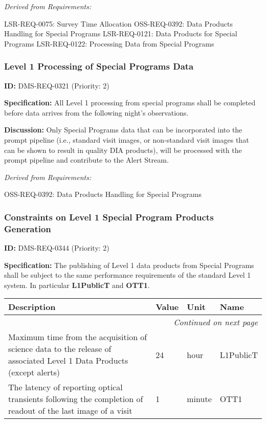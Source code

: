 \documentclass[SE,toc,lsstdraft]{lsstdoc}
\makeatletter
\newcommand{\paramname}[1]{\hspace{0pt}#1}
\newcommand{\unitname}[1]{\hspace{0pt}#1}
\newenvironment{parameters}[0]{%
\setlength\LTleft{0pt}
\setlength\LTright{\fill}
\begin{small}
\begin{longtable}[]{|p{0.49\textwidth}|l|p{0.6in}|p{1.70in}@{}|}

\hline \textbf{Description} & \textbf{Value} & \textbf{Unit} & \textbf{Name} \\ \hline
\endhead

\hline \multicolumn{4}{r}{\emph{Continued on next page}} \\
\endfoot

\hline\hline
\endlastfoot
}{%
\hline
\end{longtable}
\end{small}
}
\makeatother
\begin{document}
\emph{Derived from Requirements:}

LSR-REQ-0075:
Survey Time Allocation \newline
OSS-REQ-0392:
Data Products Handling for Special Programs \newline
LSR-REQ-0121:
Data Products for Special Programs \newline
LSR-REQ-0122:
Processing Data from Special Programs \newline

\subsubsection{Level 1 Processing of Special Programs Data}

\label{DMS-REQ-0321}
\textbf{ID:} DMS-REQ-0321 (Priority: 2)

\textbf{Specification:} All Level 1 processing from special programs shall be completed before data arrives from the following night's observations.

\textbf{Discussion:}
Only Special Programs data that can be incorporated into the prompt pipeline (i.e., standard visit images, or non-standard visit images that can be shown to result in quality DIA products), will be processed with the prompt pipeline and contribute to the Alert Stream.

\emph{Derived from Requirements:}

OSS-REQ-0392:
Data Products Handling for Special Programs \newline

\subsubsection{Constraints on Level 1 Special Program Products Generation}

\label{DMS-REQ-0344}
\textbf{ID:} DMS-REQ-0344 (Priority: 2)

\textbf{Specification:}
    The publishing of Level 1 data products from Special Programs shall be subject to the same performance requirements of the standard Level 1 system. In particular \textbf{L1PublicT} and \textbf{OTT1}.

\begin{parameters}
    Maximum time from the acquisition of science data to the release of associated Level 1 Data Products (except alerts)
&
24
&
\unitname{%
hour
}
&
\paramname{%
L1PublicT
} \\\hline
The latency of reporting optical transients following the completion of readout of the last image of a visit
&
1
&
\unitname{%
minute
}
&
\paramname{%
OTT1
} \\\hline
\end{parameters}
\end{document}
